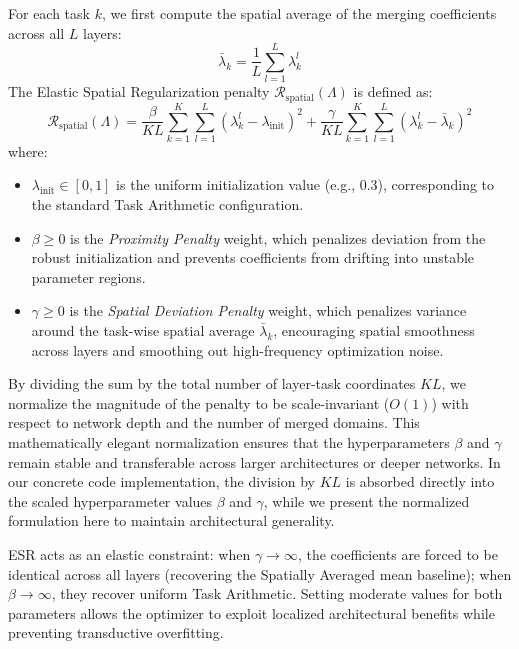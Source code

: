 For each task $k$, we first compute the spatial average of the merging coefficients across all $L$ layers:
\begin{equation}
\bar{\lambda}_k = \frac{1}{L} \sum_{l=1}^L \lambda^l_k
\end{equation}
The Elastic Spatial Regularization penalty $\mathcal{R}_{\text{spatial}}(\Lambda)$ is defined as:
\begin{equation}
\label{eq:esr}
\mathcal{R}_{\text{spatial}}(\Lambda) = \frac{\beta}{K L} \sum_{k=1}^K \sum_{l=1}^L (\lambda^l_k - \lambda_{\text{init}})^2 + \frac{\gamma}{K L} \sum_{k=1}^K \sum_{l=1}^L (\lambda^l_k - \bar{\lambda}_k)^2
\end{equation}
where:
\begin{itemize}
    \item $\lambda_{\text{init}} \in [0, 1]$ is the uniform initialization value (e.g., $0.3$), corresponding to the standard Task Arithmetic configuration.
    \item $\beta \ge 0$ is the \emph{Proximity Penalty} weight, which penalizes deviation from the robust initialization and prevents coefficients from drifting into unstable parameter regions.
    \item $\gamma \ge 0$ is the \emph{Spatial Deviation Penalty} weight, which penalizes variance around the task-wise spatial average $\bar{\lambda}_k$, encouraging spatial smoothness across layers and smoothing out high-frequency optimization noise.
\end{itemize}
By dividing the sum by the total number of layer-task coordinates $K L$, we normalize the magnitude of the penalty to be scale-invariant ($O(1)$) with respect to network depth and the number of merged domains. This mathematically elegant normalization ensures that the hyperparameters $\beta$ and $\gamma$ remain stable and transferable across larger architectures or deeper networks. In our concrete code implementation, the division by $K L$ is absorbed directly into the scaled hyperparameter values $\beta$ and $\gamma$, while we present the normalized formulation here to maintain architectural generality.

ESR acts as an elastic constraint: when $\gamma \to \infty$, the coefficients are forced to be identical across all layers (recovering the Spatially Averaged mean baseline); when $\beta \to \infty$, they recover uniform Task Arithmetic. Setting moderate values for both parameters allows the optimizer to exploit localized architectural benefits while preventing transductive overfitting.

